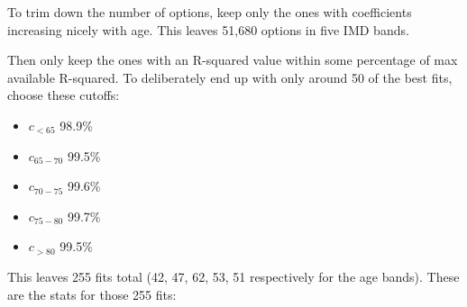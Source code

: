 \documentclass[12pt]{extarticle}
\begin{document}
To trim down the number of options, keep only the ones with coefficients increasing nicely with age. This leaves 51,680 options in five IMD bands.

Then only keep the ones with an R-squared value within some percentage of max available R-squared. To deliberately end up with only around 50 of the best fits, choose these cutoffs:
\begin{itemize}
    \item $c_{<65}$ 98.9\%
    \item $c_{65-70}$ 99.5\%
    \item $c_{70-75}$ 99.6\%
    \item $c_{75-80}$ 99.7\%
    \item $c_{>80}$ 99.5\%
\end{itemize}

This leaves 255 fits total (42, 47, 62, 53, 51 respectively for the age bands). These are the stats for those 255 fits:
\end{document}
